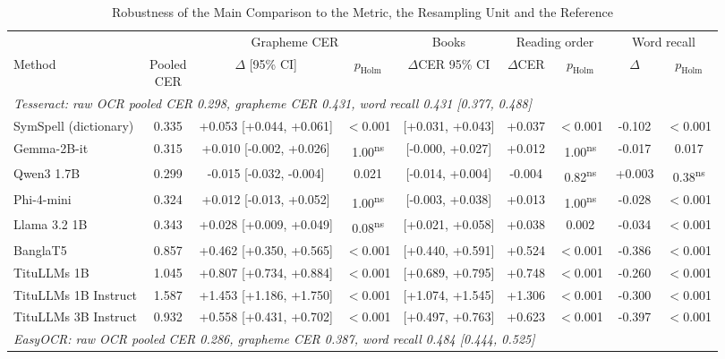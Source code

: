 \begin{table}[t]
\centering
\caption{Robustness of the Main Comparison to the Metric, the Resampling Unit and the Reference}
\label{tab:robustness}
\setlength{\tabcolsep}{4pt}
\footnotesize
\begin{tabular}{lcccccccc}
\toprule
 & & \multicolumn{2}{c}{Grapheme CER} & Books & \multicolumn{2}{c}{Reading order} & \multicolumn{2}{c}{Word recall} \\
\cmidrule(lr){3-4}\cmidrule(lr){5-5}\cmidrule(lr){6-7}\cmidrule(lr){8-9}
Method & \shortstack{Pooled\\CER} & $\Delta$ [95\% CI] & $p_{\mathrm{Holm}}$ & $\Delta$CER 95\% CI & $\Delta$CER & $p_{\mathrm{Holm}}$ & $\Delta$ & $p_{\mathrm{Holm}}$ \\
\midrule
\multicolumn{9}{l}{\textit{Tesseract: raw OCR pooled CER 0.298, grapheme CER 0.431, word recall 0.431 [0.377, 0.488]}} \\
SymSpell (dictionary) & 0.335 & +0.053 [+0.044, +0.061] & $<$0.001 & [+0.031, +0.043] & +0.037 & $<$0.001 & -0.102 & $<$0.001 \\
Gemma-2B-it & 0.315 & +0.010 [-0.002, +0.026] & 1.00\textsuperscript{ns} & [-0.000, +0.027] & +0.012 & 1.00\textsuperscript{ns} & -0.017 & 0.017 \\
Qwen3 1.7B & 0.299 & -0.015 [-0.032, -0.004] & 0.021 & [-0.014, +0.004] & -0.004 & 0.82\textsuperscript{ns} & +0.003 & 0.38\textsuperscript{ns} \\
Phi-4-mini & 0.324 & +0.012 [-0.013, +0.052] & 1.00\textsuperscript{ns} & [-0.003, +0.038] & +0.013 & 1.00\textsuperscript{ns} & -0.028 & $<$0.001 \\
Llama 3.2 1B & 0.343 & +0.028 [+0.009, +0.049] & 0.08\textsuperscript{ns} & [+0.021, +0.058] & +0.038 & 0.002 & -0.034 & $<$0.001 \\
BanglaT5 & 0.857 & +0.462 [+0.350, +0.565] & $<$0.001 & [+0.440, +0.591] & +0.524 & $<$0.001 & -0.386 & $<$0.001 \\
TituLLMs 1B & 1.045 & +0.807 [+0.734, +0.884] & $<$0.001 & [+0.689, +0.795] & +0.748 & $<$0.001 & -0.260 & $<$0.001 \\
TituLLMs 1B Instruct & 1.587 & +1.453 [+1.186, +1.750] & $<$0.001 & [+1.074, +1.545] & +1.306 & $<$0.001 & -0.300 & $<$0.001 \\
TituLLMs 3B Instruct & 0.932 & +0.558 [+0.431, +0.702] & $<$0.001 & [+0.497, +0.763] & +0.623 & $<$0.001 & -0.397 & $<$0.001 \\
\midrule
\multicolumn{9}{l}{\textit{EasyOCR: raw OCR pooled CER 0.286, grapheme CER 0.387, word recall 0.484 [0.444, 0.525]}} \\

\end{tabular}
\end{table}
